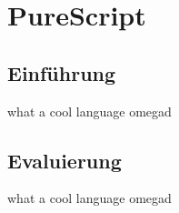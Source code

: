 \chapter{PureScript}
\section{Einführung}
what a cool language omegad
\section{Evaluierung}
what a cool language omegad


